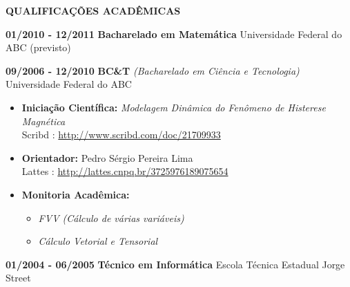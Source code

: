 \documentclass[12pt]{article}
\begin{document}
\hspace{-.39in}
	{\bf  QUALIFICAÇÕES ACADÊMICAS }
 \begin{list}{name}{ 18em \leftmargin 1.13in \itemsep -.025in }
\item [\textbf{01/2010 - 12/2011}] {\bf Bacharelado em Matemática} Universidade Federal do ABC (previsto)
\item [\textbf{09/2006 - 12/2010}] {\textbf{BC\&T} \emph{(Bacharelado em Ciência e Tecnologia)}}  Universidade Federal do ABC
\begin{itemize}
\vspace{-.04in}
\item  {\bf  Iniciação Científica:} {\em Modelagem Dinâmica do Fenômeno de Histerese Magnética}\\ \scriptsize Scribd : \url{http://www.scribd.com/doc/21709933} \normalsize
\hspace{-.29in}
\vspace{-.04in}
 \item {\bf  Orientador:} Pedro Sérgio Pereira Lima \\
 \scriptsize Lattes : \url{http://lattes.cnpq.br/3725976189075654} \normalsize
 \hspace{-.29in}
\vspace{-.04in}
 \item {\bf  Monitoria Acadêmica:} 
 \begin{itemize}
 \vspace{-.05in}
 \item  {\textit{FVV (Cálculo de várias variáveis)} } 
 \vspace{-.05in}
 \item  {\textit{Cálculo Vetorial e Tensorial}} 
 \end{itemize}
\end{itemize} 

\item [\bf 01/2004 - 06/2005] {\bf Técnico em Informática} Escola Técnica Estadual Jorge Street
\end{list}
\end{document}

